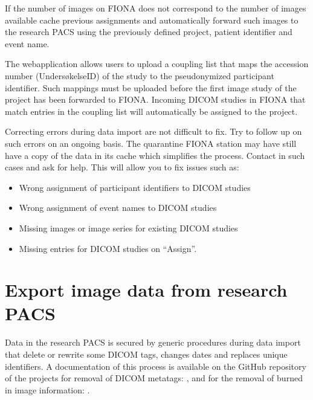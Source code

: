 \documentclass[letterpaper,10pt,english]{sphinxmanual}
\begin{document}
\sphinxAtStartPar
If the number of images on FIONA does not correspond to the number of images available cache previous assignments and automatically forward such images to the research PACS using the previously defined project, patient identifier and event name.

\sphinxAtStartPar
{}

\sphinxAtStartPar
The  web\sphinxhyphen{}application allows users to upload a coupling list that maps the accession
number (Undersøkelse\sphinxhyphen{}ID) of the study to the pseudonymized participant identifier. Such
mappings must be uploaded before the first image study of the project has been forwarded
to FIONA. Incoming DICOM studies in FIONA that match entries in the coupling list will
automatically be assigned to the project.

\sphinxAtStartPar
{}

\sphinxAtStartPar
Correcting errors during data import are not difficult to fix. Try to follow up on such errors
on an ongoing basis. The quarantine FIONA station may have still have a copy of the data in
its cache which simplifies the process. Contact  in such cases and ask for help. This will allow you to fix issues such as:
\begin{itemize}
\item {} 
\sphinxAtStartPar
Wrong assignment of participant identifiers to DICOM studies

\item {} 
\sphinxAtStartPar
Wrong assignment of event names to DICOM studies

\item {} 
\sphinxAtStartPar
Missing images or image series for existing DICOM studies

\item {} 
\sphinxAtStartPar
Missing entries for DICOM studies on “Assign”.

\end{itemize}


\section{Export image data from research PACS}
\label{\detokenize{EndUser/index:export-image-data-from-research-pacs}}
\sphinxAtStartPar
Data in the research PACS is secured by generic procedures during data import that delete or rewrite some DICOM tags, changes dates and replaces unique identifiers. A documentation of this process is available on the GitHub repository of the projects for removal of DICOM meta\sphinxhyphen{}tags: , and for the removal of burned in image information: .
\end{document}
